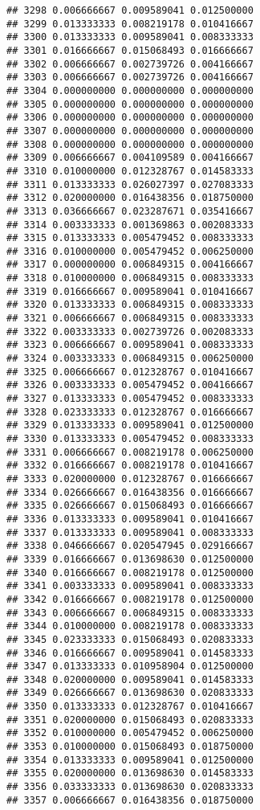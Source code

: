 \documentclass[
]{article}
\begin{document}
\begin{verbatim}
## 3298 0.006666667 0.009589041 0.012500000
## 3299 0.013333333 0.008219178 0.010416667
## 3300 0.013333333 0.009589041 0.008333333
## 3301 0.016666667 0.015068493 0.016666667
## 3302 0.006666667 0.002739726 0.004166667
## 3303 0.006666667 0.002739726 0.004166667
## 3304 0.000000000 0.000000000 0.000000000
## 3305 0.000000000 0.000000000 0.000000000
## 3306 0.000000000 0.000000000 0.000000000
## 3307 0.000000000 0.000000000 0.000000000
## 3308 0.000000000 0.000000000 0.000000000
## 3309 0.006666667 0.004109589 0.004166667
## 3310 0.010000000 0.012328767 0.014583333
## 3311 0.013333333 0.026027397 0.027083333
## 3312 0.020000000 0.016438356 0.018750000
## 3313 0.036666667 0.023287671 0.035416667
## 3314 0.003333333 0.001369863 0.002083333
## 3315 0.013333333 0.005479452 0.008333333
## 3316 0.010000000 0.005479452 0.006250000
## 3317 0.000000000 0.006849315 0.004166667
## 3318 0.010000000 0.006849315 0.008333333
## 3319 0.016666667 0.009589041 0.010416667
## 3320 0.013333333 0.006849315 0.008333333
## 3321 0.006666667 0.006849315 0.008333333
## 3322 0.003333333 0.002739726 0.002083333
## 3323 0.006666667 0.009589041 0.008333333
## 3324 0.003333333 0.006849315 0.006250000
## 3325 0.006666667 0.012328767 0.010416667
## 3326 0.003333333 0.005479452 0.004166667
## 3327 0.013333333 0.005479452 0.008333333
## 3328 0.023333333 0.012328767 0.016666667
## 3329 0.013333333 0.009589041 0.012500000
## 3330 0.013333333 0.005479452 0.008333333
## 3331 0.006666667 0.008219178 0.006250000
## 3332 0.016666667 0.008219178 0.010416667
## 3333 0.020000000 0.012328767 0.016666667
## 3334 0.026666667 0.016438356 0.016666667
## 3335 0.026666667 0.015068493 0.016666667
## 3336 0.013333333 0.009589041 0.010416667
## 3337 0.013333333 0.009589041 0.008333333
## 3338 0.046666667 0.020547945 0.029166667
## 3339 0.016666667 0.013698630 0.012500000
## 3340 0.016666667 0.008219178 0.012500000
## 3341 0.003333333 0.009589041 0.008333333
## 3342 0.016666667 0.008219178 0.012500000
## 3343 0.006666667 0.006849315 0.008333333
## 3344 0.010000000 0.008219178 0.008333333
## 3345 0.023333333 0.015068493 0.020833333
## 3346 0.016666667 0.009589041 0.014583333
## 3347 0.013333333 0.010958904 0.012500000
## 3348 0.020000000 0.009589041 0.014583333
## 3349 0.026666667 0.013698630 0.020833333
## 3350 0.013333333 0.012328767 0.010416667
## 3351 0.020000000 0.015068493 0.020833333
## 3352 0.010000000 0.005479452 0.006250000
## 3353 0.010000000 0.015068493 0.018750000
## 3354 0.013333333 0.009589041 0.012500000
## 3355 0.020000000 0.013698630 0.014583333
## 3356 0.033333333 0.013698630 0.020833333
## 3357 0.006666667 0.016438356 0.018750000

\end{verbatim}
\end{document}
